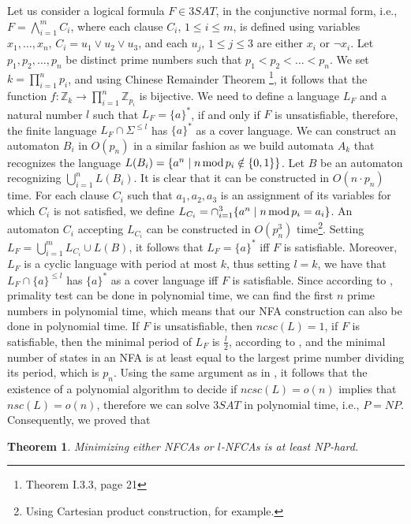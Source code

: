 \documentclass[submission,copyright,creativecommons]{eptcs}
\newcommand{\Z}{{\mathbb Z}}
\newcommand{\mod}{{\rm \,mod\,}}
\newtheorem{theorem}{Theorem}
\begin{document}
Let us consider a logical formula $F \in 3SAT$, 
 in the conjunctive normal form, i.e., $F=\displaystyle\bigwedge_{i=1}^mC_i$,
where each clause $C_i$, $1\leq i\leq m$,
is defined using variables $x_1,\ldots,x_n$, $C_i=u_1\vee u_2\vee u_3$, and each $u_j$, $1\leq j\leq 3$ are either $x_i$ or $\neg x_i$.
Let $p_1,p_2,\ldots,p_n$ be distinct prime numbers such that
$p_1<p_2<\ldots<p_n$. We set $k=\prod_{i=1}^np_i$, and 
using Chinese Remainder Theorem \cite{china}\footnote{Theorem I.3.3, page 21},
it follows that the function $f:\Z_k\longrightarrow \prod_{i=1}^n\Z_{p_i}$ is bijective.
We need to define a language $L_F$ and a natural number $l$ such that
$L_F=\{a\}^*$, if and only if  $F$ is unsatisfiable, therefore, the finite language 
$L_F\cap \Sigma^{\leq l}$ has $\{a\}^*$ as a cover language.
We can construct an automaton $B_i$ in $O( p_n)$ in a similar fashion as we build automata $A_k$
that recognizes the language
$L(B_i)=\{a^n \mid n 
\mod 
p_i\notin\{0,1\}\}$.
Let $B$ be an automaton recognizing $\bigcup_{i=1}^nL(B_i)$. 
It is clear that it can be constructed in $O(n\cdot p_n)$ time.
For each clause $C_i$ such that $a_1,a_2,a_3$ is an assignment of its 
variables  for which 
$C_i$ is not satisfied, we define $L_{C_i}=\cap_{i=1}^3\{a^n\mid n \mod p_i =a_i\}$.
An automaton $C_i$ accepting  $L_{C_i}$ can be constructed 
in $O(p_n^3)$ time\footnote{Using Cartesian product construction, for example.}. 
Setting $L_F=\bigcup_{i=1}^m L_{C_i}\cup L(B)$, it follows that 
$L_F=\{a\}^*$ iff $F$ is satisfiable. Moreover, $L_F$ is a cyclic language with period at most $k$,
 thus setting $l=k$, we have that 
$L_F\cap \{a\}^{\leq l}$ has $\{a\}^*$
as a cover language iff
 $F$ is satisfiable. 
Since according to \cite{Primtest}, primality test can be done in polynomial time, 
 we can find the first $n$ prime numbers  in polynomial time, 
which means that our NFA construction can also be done in polynomial time.
If $F$ is unsatisfiable, then $ncsc(L)=1$, if $F$ is satisfiable,
then the  minimal period of $L_F$ is $\frac{l}{2}$, according to \cite{Chrobak,gramlich}, 
 and the minimal number of states 
in an NFA is at least equal to the largest prime number dividing its period, which is $p_n$. 
Using  the same argument as in \cite{gruberholzerunary}, it 
follows that the existence of a polynomial algorithm to decide if  $ncsc(L)=o(n)$ implies that 
$nsc(L)=o(n)$, therefore we can solve $3SAT$ in polynomial time, i.e., $P=NP$.
Consequently, we proved that
\begin{theorem}
 Minimizing either NFCAs or $l$-NFCAs is at least NP-hard. 
\end{theorem}
\end{document}
